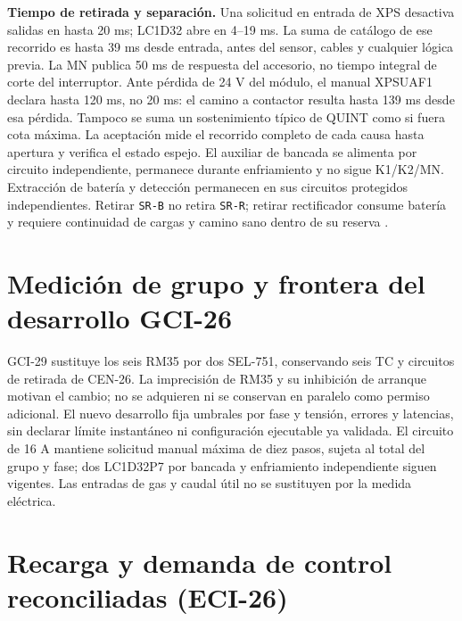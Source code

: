 \textbf{Tiempo de retirada y separación.} Una solicitud en entrada de XPS desactiva salidas en hasta 20 ms; LC1D32 abre en 4--19 ms. La suma de catálogo de ese recorrido es hasta 39 ms desde entrada, antes del sensor, cables y cualquier lógica previa. La MN publica 50 ms de respuesta del accesorio, no tiempo integral de corte del interruptor. Ante pérdida de 24 V del módulo, el manual XPSUAF1 declara hasta 120 ms, no 20 ms: el camino a contactor resulta hasta 139 ms desde esa pérdida. Tampoco se suma un sostenimiento típico de QUINT como si fuera cota máxima. La aceptación mide el recorrido completo de cada causa hasta apertura y verifica el estado espejo. El auxiliar de bancada se alimenta por circuito independiente, permanece durante enfriamiento y no sigue K1/K2/MN. Extracción de batería y detección permanecen en sus circuitos protegidos independientes. Retirar \texttt{SR-B} no retira \texttt{SR-R}; retirar rectificador consume batería y requiere continuidad de cargas y camino sano dentro de su reserva \parencites[p.~23]{lote26-xpsmanual}[p.~2]{lote26-contactor}[p.~C-37]{lote23-nsx2026}.

\section{Medición de grupo y frontera del desarrollo GCI-26}
\label{sec:sd4-medicion-gci26}
GCI-29 sustituye los seis RM35 por dos SEL-751, conservando seis TC y circuitos de retirada de CEN-26. La imprecisión de RM35 y su inhibición de arranque motivan el cambio; no se adquieren ni se conservan en paralelo como permiso adicional. El nuevo desarrollo fija umbrales por fase y tensión, errores y latencias, sin declarar límite instantáneo ni configuración ejecutable ya validada. El circuito de 16 A mantiene solicitud manual máxima de diez pasos, sujeta al total del grupo y fase; dos LC1D32P7 por bancada y enfriamiento independiente siguen vigentes. Las entradas de gas y caudal útil no se sustituyen por la medida eléctrica.

\section{Recarga y demanda de control reconciliadas (ECI-26)}
\label{sec:sd4-recarga-eci26}

